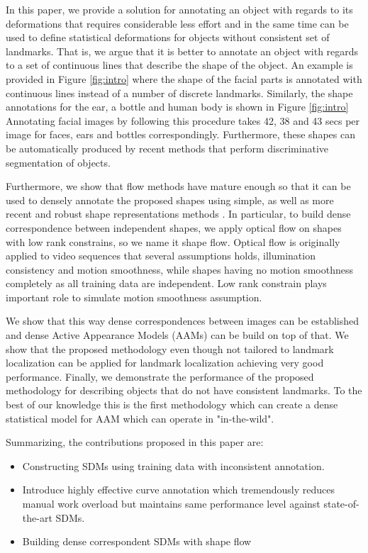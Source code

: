 In this paper, we provide a solution for annotating an object with regards to its deformations that requires considerable less effort and in the same time can be used to define statistical deformations for objects without consistent set of landmarks. That is, we argue that it is better to annotate an object with regards to a set of continuous lines that describe the shape of the object. An example is provided in Figure \ref{fig:intro} where the shape of the facial parts is annotated with continuous lines instead of a number of discrete landmarks. Similarly, the shape annotations for the ear, a bottle and human body is shown in Figure \ref{fig:intro} Annotating facial images by following this procedure takes 42, 38 and 43 secs per image for faces, ears and bottles correspondingly. Furthermore, these shapes can be automatically produced by recent methods that perform discriminative segmentation of objects. 

Furthermore, we show that flow methods have mature enough so that it can be used to densely annotate the proposed shapes using simple, as well as more recent and robust shape representations methods \cite{Garg:2013hu,Nguyen2013}.  In particular, to build dense correspondence between independent shapes, we apply optical flow on shapes with low rank constrains, so we name it shape flow. Optical flow is originally applied to video sequences that several assumptions holds, illumination consistency and motion smoothness, while shapes having no motion smoothness completely as all training data are independent. Low rank constrain plays important role to simulate motion smoothness assumption. 

We show that this way dense correspondences between images can be established and dense Active Appearance Models (AAMs) can be build on top of that. We show that the proposed methodology even though not tailored to landmark localization can be applied for landmark localization achieving very good performance. Finally, we demonstrate the performance of the proposed methodology for describing objects that do not have consistent landmarks. To the best of our knowledge this is the first methodology which can create a dense statistical model for AAM which can operate in "in-the-wild".



Summarizing, the contributions proposed in this paper are:
\begin{itemize}
  \item Constructing SDMs using training data with inconsistent annotation.
  \item Introduce highly effective curve annotation which tremendously reduces manual work overload but maintains same performance level against state-of-the-art SDMs.
  \item Building dense correspondent SDMs with shape flow
\end{itemize}

